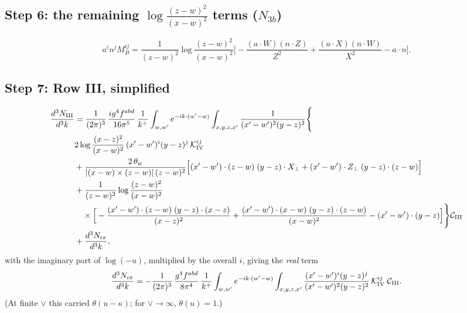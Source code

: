 \documentclass[10pt]{article}
\numberwithin{equation}{section}
\begin{document}
\subsection{Step 6: the remaining $\log\frac{(z-w)^{2}}{(x-w)^{2}}$ terms ($N_{3b}$)}
\begin{equation}
a^{i}n^{j}M^{ij}_{B}=\frac{1}{(z-w)^{2}}\log\frac{(z-w)^{2}}{(x-w)^{2}}\Big[-\frac{(a\cdot W)(n\cdot Z)}{Z^{2}}+\frac{(a\cdot X)(n\cdot W)}{X^{2}}-a\cdot n\Big].
\end{equation}

\subsection{Step 7: Row III, simplified}
\begin{align}
\frac{d^{3}N_{\rm III}}{d^{3}k}&=\frac{1}{(2\pi)^{3}}\,\frac{ig^{4}f^{abd}}{16\pi^{5}}\,\frac{1}{k^{+}}\int_{w,w'}e^{-ik\cdot(w'-w)}\int_{x,y,z,x'}\frac{1}{(x'-w')^{2}(y-z)^{2}}\Bigg\{\notag\\&2\log\frac{(x-z)^{2}}{(x-w)^{2}}\,(x'-w')^{i}(y-z)^{j}\,\mathcal K^{ij}_{\rm IV}\notag\\
&+\frac{2\,\theta_{w}}{|(x-w)\times(z-w)|\,(z-w)^{2}}\Big[(x'-w')\cdot(z-w)\;(y-z)\cdot X_{\perp}+(x'-w')\cdot Z_{\perp}\;(y-z)\cdot(z-w)\Big]\notag\\
&+\frac{1}{(z-w)^{2}}\log\frac{(z-w)^{2}}{(x-w)^{2}}\notag\\&\quad\times\Big[-\frac{(x'-w')\cdot(z-w)\;(y-z)\cdot(x-z)}{(x-z)^{2}}+\frac{(x'-w')\cdot(x-w)\;(y-z)\cdot(z-w)}{(x-w)^{2}}-(x'-w')\cdot(y-z)\Big]\Bigg\}\mathcal C_{\rm III}\notag\\
&+\frac{d^{3}N_{i\pi}}{d^{3}k},
\label{eq:R3final}
\end{align}
with the imaginary part of $\log(-u)$, multiplied by the overall $i$, giving the \emph{real} term
\begin{equation}
\frac{d^{3}N_{i\pi}}{d^{3}k}=-\frac{1}{(2\pi)^{3}}\,\frac{g^{4}f^{abd}}{8\pi^{4}}\,\frac{1}{k^{+}}\int_{w,w'}e^{-ik\cdot(w'-w)}\int_{x,y,z,x'}\frac{(x'-w')^{i}(y-z)^{j}}{(x'-w')^{2}(y-z)^{2}}\,\mathcal K^{ij}_{\rm IV}\;\mathcal C_{\rm III}.
\end{equation}
(At finite $\vee$ this carried $\theta(u-\kappa)$; for $\vee\to\infty$, $\theta(u)=1$.)
\end{document}
